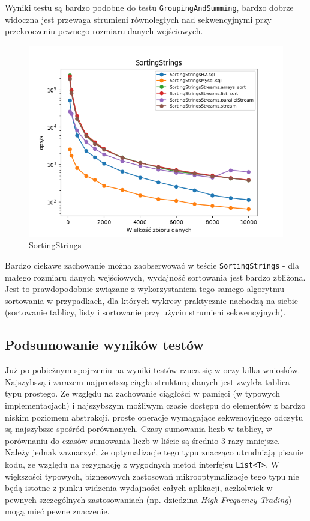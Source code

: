 \documentclass[12pt,twoside,openright]{extarticle}
\begin{document}
    Wyniki testu są bardzo podobne do testu \texttt{GroupingAndSumming}, bardzo dobrze widoczna jest przewaga strumieni równoległych nad sekwencyjnymi przy przekroczeniu pewnego rozmiaru danych wejściowych.

\newpage
\begin{figure}[H]
\centering
\includegraphics[width=15cm]{plots/SortingStrings}
\caption{SortingStrings}
\end{figure}

    Bardzo ciekawe zachowanie można zaobserwować w teście \texttt{SortingStrings} - dla małego rozmiaru danych wejściowych, wydajność sortowania jest bardzo zbliżona. Jest to prawdopodobnie związane z wykorzystaniem tego samego algorytmu sortowania w przypadkach, dla których wykresy praktycznie nachodzą na siebie (sortowanie tablicy, listy i sortowanie przy użyciu strumieni sekwencyjnych).

\newpage

\subsection{Podsumowanie wyników testów}

    Już po pobieżnym spojrzeniu na wyniki testów rzuca się w oczy kilka wniosków. Najszybszą i zarazem najprostszą ciągła strukturą danych jest zwykła tablica typu prostego. Ze względu na zachowanie ciągłości w pamięci (w typowych implementacjach) i najszybszym możliwym czasie dostępu do elementów z bardzo niskim poziomem abstrakcji, proste operacje wymagające sekwencyjnego odczytu są najszybsze spośród porównanych. Czasy sumowania liczb w tablicy, w porównaniu do czasów sumowania liczb w liście są średnio 3 razy mniejsze. Należy jednak zaznaczyć, że optymalizacje tego typu znacząco utrudniają pisanie kodu, ze względu na rezygnację z wygodnych metod interfejsu \texttt{List<T>}. W większości typowych, biznesowych zastosowań mikrooptymalizacje tego typu nie będą istotne z punku widzenia wydajności całych aplikacji, aczkolwiek w pewnych szczególnych zastosowaniach (np. dziedzina \textit{High Frequency Trading}) mogą mieć pewne znaczenie.
\end{document}
